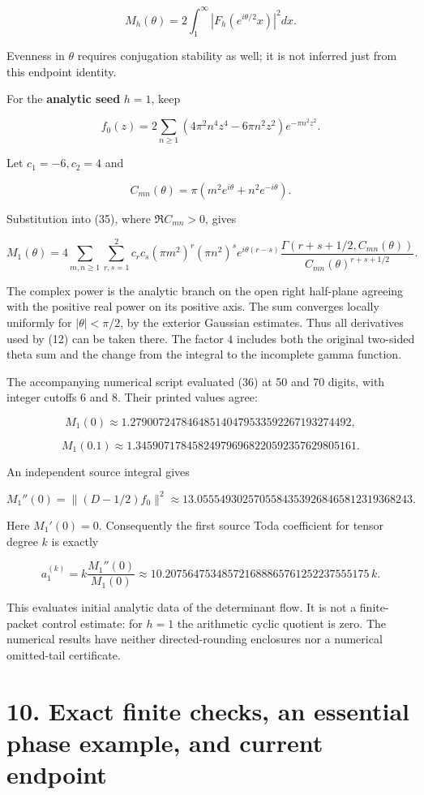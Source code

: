 \documentclass[
  11pt,
]{article}
\begin{document}
\[
\boxed{M_h(\theta)=2\int_1^\infty|F_h(e^{i\theta/2}x)|^2dx.}
\tag{35}
\]

Evenness in \(\theta\) requires conjugation stability as well; it is not
inferred just from this endpoint identity.

For the \textbf{analytic seed} \(h=1\), keep

\[
f_0(z)=2\sum_{n\ge1}(4\pi^2n^4z^4-6\pi n^2z^2)e^{-\pi n^2z^2}.
\]

Let \(c_1=-6,c_2=4\) and

\[
C_{mn}(\theta)=\pi(m^2e^{i\theta}+n^2e^{-i\theta}).
\]

Substitution into (35), where \(\Re C_{mn}>0\), gives

\[
\boxed{
M_1(\theta)=4\sum_{m,n\ge1}\sum_{r,s=1}^2
c_rc_s(\pi m^2)^r(\pi n^2)^s e^{i\theta(r-s)}
\frac{\Gamma(r+s+1/2,C_{mn}(\theta))}
{C_{mn}(\theta)^{r+s+1/2}}.
}
\tag{36}
\]

The complex power is the analytic branch on the open right half-plane
agreeing with the positive real power on its positive axis. The sum
converges locally uniformly for \(|\theta|<\pi/2\), by the exterior
Gaussian estimates. Thus all derivatives used by (12) can be taken
there. The factor \(4\) includes both the original two-sided theta sum
and the change from the integral to the incomplete gamma function.

The accompanying numerical script evaluated (36) at 50 and 70 digits,
with integer cutoffs 6 and 8. Their printed values agree:

\[
M_1(0)\approx1.279007247846485140479533592267193274492,
\]

\[
M_1(0.1)\approx1.345907178458249796968220592357629805161.
\]

An independent source integral gives

\[
M_1''(0)=\|(D-1/2)f_0\|^2
\approx13.05554930257055843539268465812319368243.
\]

Here \(M_1'(0)=0\). Consequently the first source Toda coefficient for
tensor degree \(k\) is exactly

\[
a_1^{(k)}=k\frac{M_1''(0)}{M_1(0)}
\approx10.207564753485721688865761252237555175\,k.
\tag{37}
\]

This evaluates initial analytic data of the determinant flow. It is not
a finite-packet control estimate: for \(h=1\) the arithmetic cyclic
quotient is zero. The numerical results have neither directed-rounding
enclosures nor a numerical omitted-tail certificate.

\section{10. Exact finite checks, an essential phase example, and
current
endpoint}\label{exact-finite-checks-an-essential-phase-example-and-current-endpoint}
\end{document}
